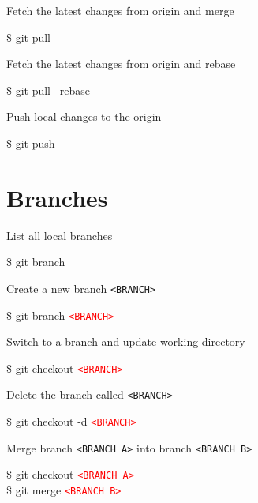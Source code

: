 \documentclass[10pt,a4paper]{article}
\newenvironment{cheatentry}{%
    \noindent%
    \begin{minipage}{\columnwidth}%
    \small%
    \noindent%
}{%
    \end{minipage}%
}
\newcommand{\entrysep}{\vspace{1em}}
\newcommand{\cheatcmd}[1]{%
    \noindent\begin{cmdbox}{\large\ttfamily\fontseries{b}\selectfont #1}\end{cmdbox}
}
\newcommand{\cheatmetavar}[1]{%
    \textcolor{red}{\texttt{\textless{}#1\textgreater{}}}%
}
\newcommand{\cheatmetavarref}[1]{%
    {\texttt{\textless{}#1\textgreater{}}}%
}
\begin{document}
\begin{multicols}{4}
\entrysep{}%

\begin{cheatentry}%
Fetch the latest changes from origin and merge
\cheatcmd{\$ git pull}
\end{cheatentry}

\entrysep{}%

\begin{cheatentry}%
Fetch the latest changes from origin and rebase
\cheatcmd{\$ git pull --rebase}
\end{cheatentry}

\entrysep{}%

\begin{cheatentry}%
Push local changes to the origin
\cheatcmd{\$ git push}
\end{cheatentry}

\section{Branches}

\begin{cheatentry}%
List all local branches
\cheatcmd{\$ git branch}
\end{cheatentry}%

\entrysep{}%

\begin{cheatentry}%
Create a new branch \cheatmetavarref{BRANCH}
\cheatcmd{\$ git branch \cheatmetavar{BRANCH}}
\end{cheatentry}%

\entrysep{}%

\begin{cheatentry}%
Switch to a branch and update working directory
\cheatcmd{\$ git checkout \cheatmetavar{BRANCH}}
\end{cheatentry}

\entrysep{}%

\begin{cheatentry}%
Delete the branch called \cheatmetavarref{BRANCH}
\cheatcmd{\$ git checkout -d \cheatmetavar{BRANCH}}
\end{cheatentry}

\entrysep{}%

\begin{cheatentry}%
Merge branch \cheatmetavarref{BRANCH~A} into branch \cheatmetavarref{BRANCH~B}
\cheatcmd{\$ git checkout \cheatmetavar{BRANCH~A}\\\$ git merge \cheatmetavar{BRANCH~B}}
\end{cheatentry}


\end{multicols}
\end{document}
